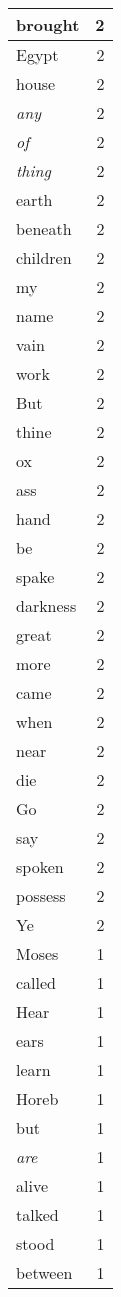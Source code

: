 \begin{center}
\begin{longtable}{l|r}
brought & 2 \\ \hline
Egypt & 2 \\ \hline
house & 2 \\ \hline
\emph{any} & 2 \\ \hline
\emph{of} & 2 \\ \hline
\emph{thing} & 2 \\ \hline
earth & 2 \\ \hline
beneath & 2 \\ \hline
children & 2 \\ \hline
my & 2 \\ \hline
name & 2 \\ \hline
vain & 2 \\ \hline
work & 2 \\ \hline
But & 2 \\ \hline
thine & 2 \\ \hline
ox & 2 \\ \hline
ass & 2 \\ \hline
hand & 2 \\ \hline
be & 2 \\ \hline
spake & 2 \\ \hline
darkness & 2 \\ \hline
great & 2 \\ \hline
more & 2 \\ \hline
came & 2 \\ \hline
when & 2 \\ \hline
near & 2 \\ \hline
die & 2 \\ \hline
Go & 2 \\ \hline
say & 2 \\ \hline
spoken & 2 \\ \hline
possess & 2 \\ \hline
Ye & 2 \\ \hline
Moses & 1 \\ \hline
called & 1 \\ \hline
Hear & 1 \\ \hline
ears & 1 \\ \hline
learn & 1 \\ \hline
Horeb & 1 \\ \hline
but & 1 \\ \hline
\emph{are} & 1 \\ \hline
alive & 1 \\ \hline
talked & 1 \\ \hline
stood & 1 \\ \hline
between & 1 \\ \hline

\end{longtable}
\end{center}
